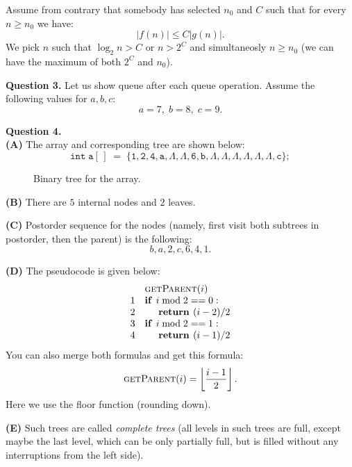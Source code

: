 \documentclass[a4paper,12pt]{article}
\begin{document}
Assume from contrary that somebody has selected $n_0$ and $C$ such 
that for every $n \geq n_0$ we have:
$$|f(n)| \leq C |g(n)|.$$
We pick $n$ such that $\log_2 n > C$ or $n > 2^C$ and simultaneosly 
$n \geq n_0$ (we can have the maximum of both $2^C$ and $n_0$). 

\vspace{20pt}
{\bf Question 3.} Let us show queue after each queue operation. 
Assume the following values for $a,b,c$:
$$a = 7,\; b = 8,\; c = 9.$$






\vspace{20pt}
{\bf Question 4.}\\
{\bf (A)} The array and corresponding tree are shown below: 
$$\mathtt{int\;a[\,]\;=\;\{1, 2, 4, a, \Lambda, \Lambda, 6, b, \Lambda, \Lambda, \Lambda, \Lambda, \Lambda, \Lambda, c\};}$$

\begin{figure}[!htb]
\caption{\label{fig:prob4-midterm-binary-tree} Binary tree for the array.}
\end{figure}

\vspace{5pt}
{\bf (B)} There are $5$ internal nodes and $2$ leaves. 

\vspace{5pt}
{\bf (C)} Postorder sequence for the nodes (namely, first visit both subtrees in postorder, then the parent)
is the following: 
$$b,a,2,c,6,4,1.$$

\vspace{5pt}
{\bf (D)} The pseudocode is given below:
\[
\begin{array}{rl}
 & \text{\sc getParent}(i)\\
1 & \text{\textbf{if\ }}i\;\text{mod}\;2 ==0:\\
2 & \hspace{.5cm} \text{\textbf{return\ }} (i-2)/2\\
3 & \text{\textbf{if\ }}i\;\text{mod}\;2 ==1:\\
4 & \hspace{.5cm} \text{\textbf{return\ }} (i-1)/2\\
\end{array}
\]
You can also merge both formulas and get this formula:
$$\text{\sc getParent}(i) = \left\lfloor \frac{i-1}{2} \right\rfloor.$$
Here we use the floor function (rounding down). 

\vspace{5pt}
{\bf (E)} Such trees are called {\em complete trees} (all levels in such trees are full, 
except maybe the last level, which can be only partially full, but is filled
without any interruptions from the left side). 
\end{document}
